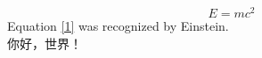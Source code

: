 \documentclass{article}
\begin{document}
  \begin{equation}\label{1}
    E=mc^2
  \end{equation}
  Equation \eqref{1} was recognized by Einstein. \\
  你好，世界！
\end{document}
